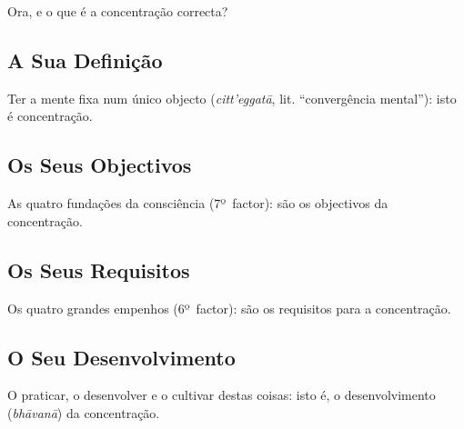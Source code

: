 

Ora, e o que é a concentração correcta?

\subsection{A Sua Definição}

Ter a mente fixa num único objecto (\emph{citt'eggatā}, lit. “convergência
mental”): isto é concentração.

\subsection{Os Seus Objectivos}

As quatro fundações da consciência (7º~factor): são os objectivos da
concentração.

\subsection{Os Seus Requisitos}

Os quatro grandes empenhos (6º~factor): são os requisitos para a concentração.

\subsection{O Seu Desenvolvimento}

\enlargethispage{\baselineskip}

O praticar, o desenvolver e o cultivar destas coisas: isto é, o
desenvolvimento (\emph{bhāvanā}) da concentração.


